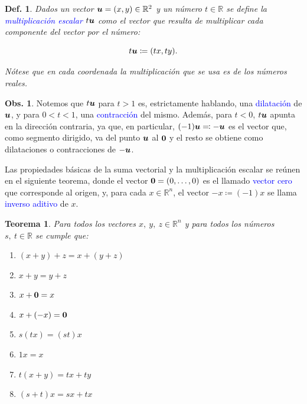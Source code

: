 \documentclass{article}
\theoremstyle{definicion}
\newtheorem{definicion}{Def.}
\theoremstyle{definition}             %
\theoremstyle{definition}             %
\theoremstyle{definition}
\theoremstyle{definition}
\theoremstyle{observacion}
\newtheorem{obs}{Obs.}
\theoremstyle{definition}
\theoremstyle{plain}
\newtheorem{theorem}{Teorema}
\theoremstyle{definition}
\theoremstyle{afirmacion}
\theoremstyle{notation}
\theoremstyle{definition}
\begin{document}
    \begin{definicion}
        Dados un vector \(\vb*{u} = (x, y) \in \mathbb{R}^{2}\) y un número \(t \in \mathbb{R}\) se define la \textcolor{blue}{multiplicación escalar} \(t \vb*{u}\) como el vector que resulta de multiplicar cada componente del vector por el número:

        \begin{equation*}
            t \vb*{u} \coloneq (t x, t y).
        \end{equation*}

        Nótese que en cada coordenada la multiplicación que se usa es de los números reales.
    \end{definicion}

    \begin{obs}
        Notemos que \(t \vb*{u}\) para \(t > 1\) es, estrictamente hablando, una \textcolor{blue}{dilatación} de \(\vb*{u}\), y para \(0 < t < 1\), una \textcolor{blue}{contracción} del mismo. Además, para \(t < 0\), \(t \vb*{u}\) apunta en la dirección contraria, ya que, en particular, \((-1) \vb*{u} \eqqcolon - \vb*{u}\) es el vector que, como segmento dirigido, va del punto \(\vb*{u}\) al \(\vb*{0}\) y el resto se obtiene como dilataciones o contracciones de \(- \vb*{u}\).
    \end{obs}

    Las propiedades básicas de la suma vectorial y la multiplicación escalar se reúnen en el siguiente teorema, donde el vector \(\vb*{0} = (0, \dots, 0)\) es el llamado \textcolor{blue}{vector cero} que corresponde al origen, y, para cada \(x \in \mathbb{R}^{n}\), el vector \(-x \coloneq (-1)x\) se llama \textcolor{blue}{inverso aditivo} de \(x\).

    \begin{theorem}
        Para todos los vectores \(x,\ y,\ z \in \mathbb{R}^{n}\) y para todos los números \(s,\ t \in \mathbb{R}\) se cumple que:

        \begin{enumerate}[label = \textnormal{\Roman*)}]
            \item \((x + y) + z = x + (y + z)\)
            \item \(x + y = y + z\)
            \item \(x + \vb*{0} = x\)
            \item \(x + (-x) = \vb*{0}\)
            \item \(s(tx) = (st)x\)
            \item \(1x = x\)
            \item \(t(x + y) = tx + ty\)
            \item \((s + t)x = sx + tx\)
        \end{enumerate}
    \end{theorem}
\end{document}
